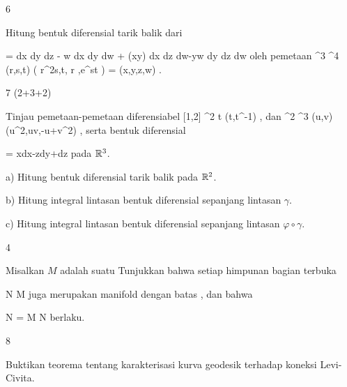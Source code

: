 {6}
{

Hitung bentuk diferensial tarik balik
\mathl{\varphi^* \tau}{} dari

\mavergleichskettedisp
{\vergleichskette
{ \tau
}
{ =} { dx \wedge dy \wedge dz - w dx \wedge dy \wedge dw + \cos (xy)  dx \wedge dz \wedge dw-yw dy \wedge dz \wedge dw
}
{ } {
}
{ } {
}
{ } {
}
}
{}{}{}
oleh pemetaan
\maabbeledisp {\varphi} { \R^3 } { \R^4
} { (r,s,t) } {  \left(  r^2s,t, \sin  r ,e^{st}  \right)  = (x,y,z,w)
} {.}

}
{} {}

{7 (2+3+2)}
{

Tinjau pemetaan-pemetaan diferensiabel
\maabbeledisp {\gamma} { [1,2] } {\R^2
} { t } {(t,t^{-1})
} {,}
dan
\maabbeledisp {\varphi} {\R^2} {\R^3
} {(u,v)} {(u^2,uv,-u+v^2)
} {,}
serta bentuk diferensial

\mavergleichskettedisp
{\vergleichskette
{ \omega
}
{ =} { xdx-zdy+dz
}
{ } {
}
{ } {
}
{ } {
}
}
{}{}{}
pada ${\mathbb R}^3$.

a) Hitung bentuk diferensial tarik balik
\mathl{\varphi^* \omega}{} pada ${\mathbb R}^2$.

b) Hitung integral lintasan bentuk diferensial
\mathl{\varphi^* \omega}{} sepanjang lintasan $\gamma$.

c) Hitung
 {} {}
integral lintasan bentuk diferensial
\mathl{\omega}{} sepanjang lintasan $\varphi \circ \gamma$.

}
{} {}

{4}
{

Misalkan $M$ adalah suatu
Tunjukkan bahwa setiap himpunan bagian terbuka

\mavergleichskette
{\vergleichskette
{ N
}
{ \subseteq }{ M
}
{  }{
}
{    }{
}
{   }{
}
}
{}{}{}
juga merupakan manifold dengan batas
 {} {},
dan bahwa

\mavergleichskettedisp
{\vergleichskette
{ \partial N
}
{ =} { \partial M \cap N
}
{ } {
}
{ } {
}
{ } {
}
}
{}{}{}
berlaku.

}
{} {}

{8}
{

Buktikan teorema tentang karakterisasi kurva geodesik terhadap koneksi Levi-Civita.

}
{} {}
